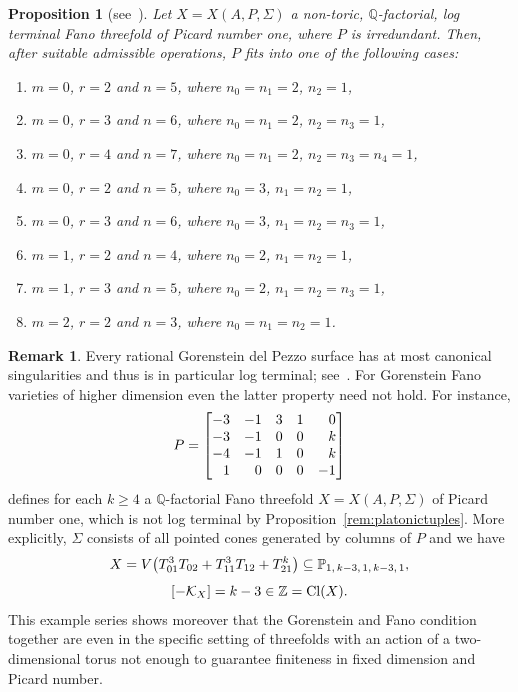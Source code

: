 \documentclass[pdftex]{sigma}%
\newtheorem{prop}[thm]{Proposition}
\theoremstyle{definition}
\newtheorem{rema}[thm]{Remark}
\def\Cl{{\rm Cl}}
\def\ZZ{{\mathbb Z}}
\def\QQ{{\mathbb Q}}
\def\PP{{\mathbb P}}
\numberwithin{equation}{section}
\begin{document}
\begin{prop}[{see~\cite[Lemma~5.2]{BeHaHuNi}}]
\label{rem:piconeconfigs}
Let $X = X(A,P,\Sigma)$ a non-toric,
$\QQ$-factorial, log terminal Fano threefold
of Picard number one, where $P$ is irredundant.
Then, after suitable admissible operations,
$P$ fits into one of the following cases:
\begin{enumerate}\itemsep=0pt
\item[$(i)$]
 $m=0$, $r=2$ and $n=5$, where $n_0 = n_1 = 2$, $n_2 = 1$,
\item[$(ii)$]
 $m=0$, $r=3$ and $n=6$, where $n_0 = n_1 = 2$, $n_2 = n_3 = 1$,
\item[$(iii)$]
 $m=0$, $r=4$ and $n=7$, where $n_0 = n_1 = 2$, $n_2 = n_3 = n_4 = 1$,
\item[$(iv)$]
 $m=0$, $r=2$ and $n=5$, where $n_0 = 3$, $n_1 = n_2 = 1$,
\item[$(v)$]
 $m=0$, $r=3$ and $n=6$, where $n_0 = 3$, $n_1 = n_2 = n_3 = 1$,
\item[$(vi)$]
$m=1$, $r=2$ and $n=4$, where $n_0 = 2$, $n_1 = n_2 = 1$,
\item[$(vii)$]
$m=1$, $r=3$ and $n=5$, where $n_0 = 2$, $n_1 = n_2 = n_3 = 1$,
\item[$(viii)$]
$m=2$, $r=2$ and $n=3$, where $n_0 = n_1 = n_2 = 1$.
\end{enumerate}
\end{prop}




\begin{rema}
Every rational Gorenstein del Pezzo surface has
at most canonical singularities and thus is in
particular log terminal; see~\cite{HiWa}.
For Gorenstein Fano varieties of higher dimension
even the latter property need not hold. For instance,
\[
P =\begin{bmatrix}
-3 & -1 & 3 & 1 & $\phantom{$-$}$0
\\
-3 & -1 & 0 & 0 & $\phantom{$-$}$k
\\
-4 & -1 & 1 & 0 & $\phantom{$-$}$k
\\
 $\phantom{$-$}$1 & $\phantom{$-$}$0 & 0 & 0 & -1
\end{bmatrix}
\]
defines for each $k \ge 4$ a $\QQ$-factorial
Fano threefold $X = X(A,P,\Sigma)$ of Picard number
one, which is not log terminal by
Proposition~\ref{rem:platonictuples}.
More explicitly, $\Sigma$ consists of all
pointed cones generated by columns of $P$
and we have
\begin{gather*}
X =
V\big(T_{01}^3T_{02} + T_{11}^3T_{12} + T_{21}^k\big)
 \subseteq\PP_{1,\, k-3, \, 1, \, k-3, \, 1},
\\[1ex]
[ - \mathcal{K}_X ] =k - 3 \in\ZZ =\Cl(X).
\end{gather*}
This example series shows moreover that the
Gorenstein and Fano condition together are
even in the specific setting of threefolds
with an action of a two-dimensional torus
not enough to guarantee finiteness in fixed
dimension and Picard number.
\end{rema}
\end{document}
